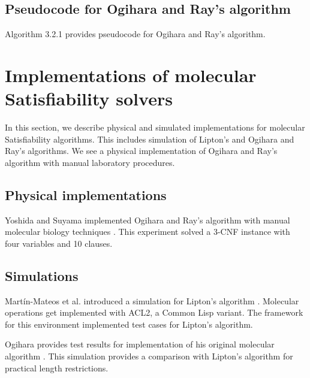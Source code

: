 	\subsection{Pseudocode for Ogihara and Ray's algorithm}

	
Algorithm 3.2.1 provides pseudocode for Ogihara and Ray's algorithm.
	
	
	

	

\section{Implementations of molecular {\sc Satisfiability} solvers}

	In this section, we describe physical and simulated implementations for molecular {\sc Satisfiability} algorithms.  This includes simulation of Lipton's and Ogihara and Ray's algorithms.  We see a physical implementation of Ogihara and Ray's algorithm with manual laboratory procedures.

	\subsection{Physical implementations}
	

Yoshida and Suyama implemented Ogihara and Ray's algorithm with manual molecular biology techniques \cite{dnaBasedImplemetation_Yoshida2000}.  This experiment solved a 3-CNF instance with four variables and 10 clauses.

	
	\subsection{Simulations}

Martín-Mateos et al. introduced a simulation for Lipton's algorithm \cite{MartinMateos02molecularcomputation}.   Molecular operations get implemented with ACL2, a Common Lisp variant.  The framework for this environment implemented test cases for Lipton's algorithm.

Ogihara provides test results for implementation of his original molecular algorithm \cite{Ogihara:1996:BFS:898228}.  This simulation provides a comparison with Lipton's algorithm for practical length restrictions.
